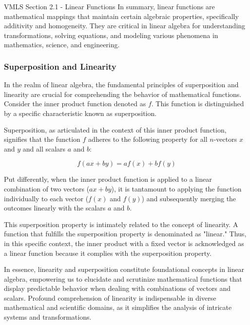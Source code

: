 \begin{notes}{VMLS Section 2.1 - Linear Functions}
    In summary, linear functions are mathematical mappings that maintain certain algebraic properties, specifically additivity and homogeneity. They are critical in linear algebra for understanding transformations, 
    solving equations, and modeling various phenomena in mathematics, science, and engineering.

    \subsubsection*{Superposition and Linearity}

    In the realm of linear algebra, the fundamental principles of superposition and linearity are crucial for comprehending the behavior of mathematical functions. Consider the inner product function denoted as \(f\). 
    This function is distinguished by a specific characteristic known as superposition.
    
    Superposition, as articulated in the context of this inner product function, signifies that the function \(f\) adheres to the following property for all \(n\)-vectors \(x\) and \(y\) and all scalars \(a\) and \(b\):
    
    \begin{equation*}
        f(ax + by) = af(x) + bf(y)
    \end{equation*}
    
    Put differently, when the inner product function is applied to a linear combination of two vectors (\(ax + by\)), it is tantamount to applying the function individually to each vector (\(f(x)\) and \(f(y)\)) and 
    subsequently merging the outcomes linearly with the scalars \(a\) and \(b\).
    
    This superposition property is intimately related to the concept of linearity. A function that fulfills the superposition property is denominated as "linear." Thus, in this specific context, the inner product with 
    a fixed vector is acknowledged as a linear function because it complies with the superposition property.
    
    In essence, linearity and superposition constitute foundational concepts in linear algebra, empowering us to elucidate and scrutinize mathematical functions that display predictable behavior when dealing with 
    combinations of vectors and scalars. Profound comprehension of linearity is indispensable in diverse mathematical and scientific domains, as it simplifies the analysis of intricate systems and transformations.


\end{notes}
